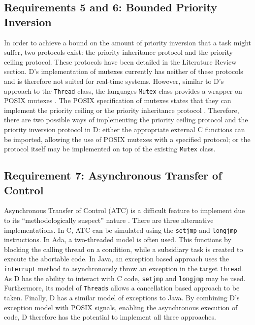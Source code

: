 \subsection{Requirements 5 and 6: Bounded Priority Inversion} %
In order to achieve a bound on the amount of priority inversion that a task
might suffer, two protocols exist: the priority inheritance protocol and the
priority ceiling protocol. These protocols have been detailed in the 
Literature Review section. D's implementation of mutexes currently has
neither of these protocols and is therefore not suited for real-time systems.
However, similar to D's approach to the \texttt{Thread} class, the languages
\texttt{Mutex} class provides a wrapper on POSIX mutexes
\cite{dlang-github-mutex}. The POSIX specification of mutexes states that
they can implement the priority ceiling or the priority inheritance protocol 
\cite{mutex-setprotocol}. Therefore, there are two possible ways of
implementing the priority ceiling protocol and the priority inversion protocol
in D: either the appropriate external C functions can be imported, allowing the
use of POSIX mutexes with a specified protocol; or the protocol itself may be
implemented on top of the existing \texttt{Mutex} class. 

\subsection{Requirement 7: Asynchronous Transfer of Control} %
Asynchronous Transfer of Control (ATC) is a difficult feature to implement due to
its ``methodologically suspect'' nature \cite{Brosgol:2002:ATC}. There are
three alternative implementations. In C, ATC can be simulated using the
\texttt{setjmp} and \texttt{longjmp} instructions. In Ada, a
two-threaded model is often used. This functions by blocking the calling thread
on a condition, while a subsidiary task is created to execute the abortable
code. In Java, an exception based approach uses the \texttt{interrupt}
method to asynchronously throw an exception in the target \texttt{Thread}. 
As D has the ability to interact with C code, \texttt{setjmp} and \texttt{longjmp} may be
used. Furthermore, its model of \texttt{Threads} allows a cancellation based
approach to be taken. Finally, D has a similar model of exceptions to Java. By
combining D's exception model with POSIX signals, enabling the asynchronous
execution of code, D therefore has the potential to implement all three
approaches.
